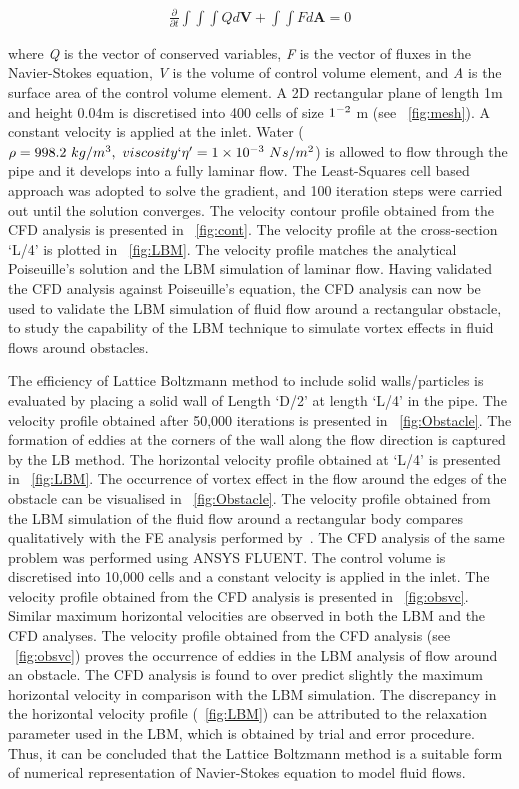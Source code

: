 \begin{align}
\frac{\partial}{\partial t} \int\int\int  Q d\mathbf{V} + \int\int \mathit{F} d\mathbf{A} = 0
\end{align}

where \textit{Q} is the vector of conserved variables, \textit{F} is the vector 
of fluxes in the Navier-Stokes equation, \textit{V} is the volume of control 
volume element, and \textit{A} is the surface area of the control volume 
element. A 2D rectangular plane of length 1m and height 0.04m is discretised 
into 400 cells of size $1 \time 10^{-2} $ m (see ~\cref{fig:mesh}). A constant 
velocity is applied at the inlet. Water ($\rho = 998.2\mbox{ }kg/m^{3},\mbox{ } 
viscosity`\eta'=1 \times 10^{-3}\mbox{ } Ns/m^{2} $) is allowed to flow through 
the pipe and it develops into a fully laminar flow. The Least-Squares cell 
based approach was adopted to solve the gradient, and 100 iteration steps were 
carried out until the solution converges. The velocity contour profile obtained 
from the CFD analysis is presented in ~\cref{fig:cont}. The velocity profile at 
the cross-section `L/4' is plotted in ~\cref{fig:LBM}. The velocity profile 
matches the analytical Poiseuille's solution and the LBM simulation of laminar 
flow. Having validated the CFD analysis against Poiseuille's equation, the CFD 
analysis can now be used to validate the LBM simulation of fluid flow around a 
rectangular obstacle, to study the capability of the LBM technique to simulate 
vortex effects in fluid flows around obstacles.

The efficiency of Lattice Boltzmann method to include solid walls/particles is 
evaluated by placing a solid wall of Length `D/2' at length `L/4' in the pipe. 
The velocity profile obtained after 50,000 iterations is presented in 
~\cref{fig:Obstacle}. The formation of eddies at the corners of the wall along 
the flow direction is captured by the LB method. The horizontal velocity 
profile obtained at `L/4' is presented in ~\cref{fig:LBM}. The occurrence of 
vortex effect in the flow around the edges of the obstacle can be visualised in 
~\cref{fig:Obstacle}. The velocity profile obtained from the LBM simulation of 
the fluid flow around a rectangular body compares qualitatively with the FE 
analysis performed by~\citet{Zhong1991}. The CFD analysis of the same problem 
was performed using ANSYS FLUENT. The control volume is discretised into 10,000 
cells and a constant velocity is applied in the inlet. The velocity profile 
obtained from the CFD analysis is presented in ~\cref{fig:obsvc}. Similar 
maximum horizontal velocities are observed in both the LBM and the CFD 
analyses. The velocity profile obtained from the CFD analysis (see 
~\cref{fig:obsvc}) proves the occurrence of eddies in the LBM analysis of flow 
around an obstacle. The CFD analysis is found to over predict slightly the 
maximum horizontal velocity in comparison with the LBM simulation. The 
discrepancy in the horizontal velocity profile (~\cref{fig:LBM}) can be 
attributed to the relaxation parameter used in the LBM, which is obtained by 
trial and error procedure. Thus, it can be concluded that the Lattice Boltzmann 
method is a suitable form of numerical representation of Navier-Stokes equation 
to model fluid flows. 

